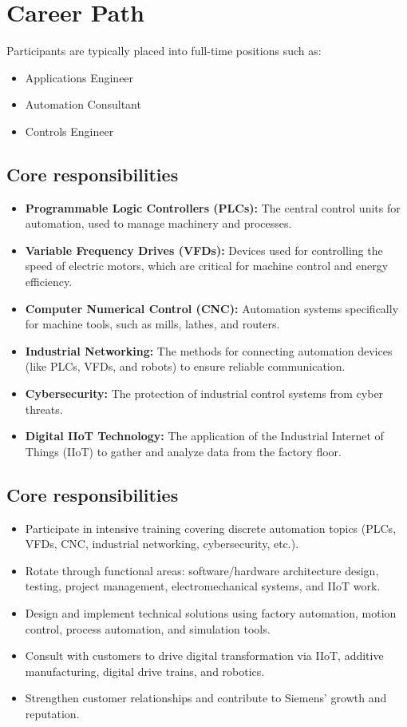 \documentclass[11pt]{article}
\begin{document}
\section*{Career Path}
Participants are typically placed into full-time positions such as:
\begin{itemize}
  \item Applications Engineer
  \item Automation Consultant
  \item Controls Engineer
\end{itemize}

\newpage
\subsection*{Core responsibilities}
\begin{itemize}
  \item \textbf{Programmable Logic Controllers (PLCs):} The central control units for automation, used to manage machinery and processes.
  \item \textbf{Variable Frequency Drives (VFDs):} Devices used for controlling the speed of electric motors, which are critical for machine control and energy efficiency.
  \item \textbf{Computer Numerical Control (CNC):} Automation systems specifically for machine tools, such as mills, lathes, and routers.
  \item \textbf{Industrial Networking:} The methods for connecting automation devices (like PLCs, VFDs, and robots) to ensure reliable communication.
  \item \textbf{Cybersecurity:} The protection of industrial control systems from cyber threats.
  \item \textbf{Digital IIoT Technology:} The application of the Industrial Internet of Things (IIoT) to gather and analyze data from the factory floor.
\end{itemize}

\subsection*{Core responsibilities}
\begin{itemize}
  \item Participate in intensive training covering discrete automation topics (PLCs, VFDs, CNC, industrial networking, cybersecurity, etc.).
  \item Rotate through functional areas: software/hardware architecture design, testing, project management, electromechanical systems, and IIoT work.
  \item Design and implement technical solutions using factory automation, motion control, process automation, and simulation tools.
  \item Consult with customers to drive digital transformation via IIoT, additive manufacturing, digital drive trains, and robotics.
  \item Strengthen customer relationships and contribute to Siemens' growth and reputation.
\end{itemize}
\end{document}
